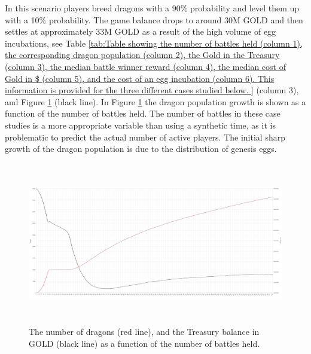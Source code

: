 \documentclass[12pt]{article}
\begin{document}
{In this scenario players breed dragons with a 90$\%$  probability and level them up with a 10$\%$  probability. The game balance drops to around 30M GOLD and then settles at approximately 33M GOLD as a result of the high volume of egg incubations, see  Table \ref{tab:Table showing the number of battles held (column 1), the corresponding dragon population (column 2), the Gold in the Treasury (column 3), the median battle winner reward (column 4), the median cost of Gold in $ (column 5), and the cost of an egg incubation (column 6).  This information is provided for the three different cases studied below. } (column 3), and Figure \ref{fig:The number of dragons (red line) as a function of the number of battles held, and the Treasury balance in GOLD (black line)} (black line). In Figure \ref{fig:The number of dragons (red line) as a function of the number of battles held, and the Treasury balance in GOLD (black line)} the dragon population growth is shown as a function of the number of battles held. The number of battles in these case studies is a more appropriate variable than using a synthetic time, as it is problematic to predict the actual number of active players. The initial sharp growth of the dragon population is due to the distribution of genesis eggs.\par




\begin{figure}[H]
	\begin{Center}
		\includegraphics[width=6.27in,height=2.79in]{./media/CS1nimage21.png}
		\caption{The number of dragons (red line), and the Treasury balance in GOLD (black line)  as a function of the number of battles held.}
		\label{fig:The number of dragons (red line) as a function of the number of battles held, and the Treasury balance in GOLD (black line)}
	\end{Center}
\end{figure}


}
\end{document}
